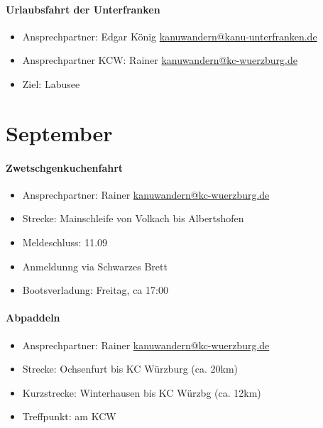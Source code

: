 \documentclass[12pt, a4paper]{report}
\begin{document}
\paragraph{Urlaubsfahrt der Unterfranken}
\begin{itemize}
    \item Ansprechpartner: Edgar König \href{mailto:kanuwandern@kanu-unterfranken.de}{kanuwandern@kanu-unterfranken.de}
    \item Ansprechpartner KCW: Rainer \href{mailto:kanuwandern@kc-wuerzburg.de}{kanuwandern@kc-wuerzburg.de}
    \item Ziel: Labusee
\end{itemize}

\section*{September}\paragraph{Zwetschgenkuchenfahrt}
\begin{itemize}
    \item Ansprechpartner: Rainer \href{mailto:kanuwandern@kc-wuerzburg.de}{kanuwandern@kc-wuerzburg.de}
    \item Strecke: Mainschleife von Volkach bis Albertshofen
    \item Meldeschluss: 11.09
    \item Anmeldunng via Schwarzes Brett
    \item Bootsverladung: Freitag, ca 17:00
\end{itemize}

\paragraph{Abpaddeln}
\begin{itemize}
    \item Ansprechpartner: Rainer \href{mailto:kanuwandern@kc-wuerzburg.de}{kanuwandern@kc-wuerzburg.de}
    \item Strecke: Ochsenfurt bis KC Würzburg (ca. 20km)
    \item Kurzstrecke: Winterhausen bis KC Würzbg (ca. 12km)
    \item Treffpunkt: am KCW
\end{itemize}
\end{document}
